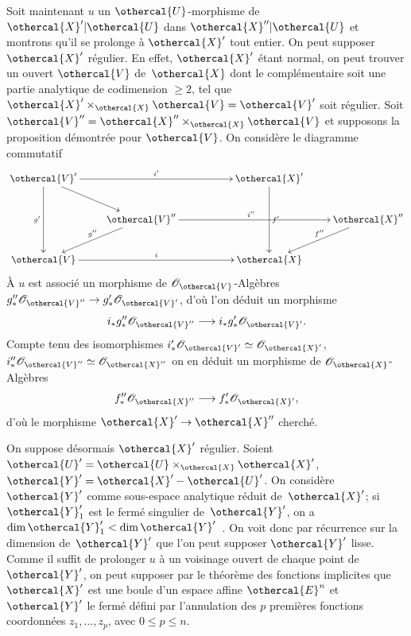 Soit maintenant $u$ un $\othercal{U}$-morphisme de~$\othercal{X}'|\othercal{U}$
dans $\othercal{X}''|\othercal{U}$ et montrons qu'il se prolonge \`a
$\othercal{X}'$ tout entier. On peut supposer $\othercal{X}'$ r\'egulier.
En effet, $\othercal{X}'$ \'etant normal, on peut trouver un ouvert
$\othercal{V}$ de~$\othercal{X}$ dont le compl\'ementaire soit une partie
analytique de codimension $\geq 2$, tel que
$\othercal{X}'\times_{\othercal{X}}\othercal{V}=\othercal{V}'$ soit r\'egulier.
Soit $\othercal{V}''=\othercal{X}''\times_{\othercal{X}}\othercal{V}$ et supposons la
proposition d\'emontr\'ee pour $\othercal{V}$. On consid\`ere le
diagramme commutatif
$$
\xymatrix{{\othercal{V}'}\ar[dd]_{g'}\ar[rd]\ar[rrr]^{i'}&& &{\othercal{X}'}\ar[dd]^{f'}\\ &{\othercal{V}''}\ar[ld]_{g''\mkern-10mu}\ar[rrr]^-{i''~~}& &
&{\othercal{X}''}\ar[ld]_{f''\mkern-12mu}\\{\othercal{V}}\ar[rrr]^{i}&& &{\othercal{X}}\\
}
$$
\`A $u$ est associ\'e un morphisme de
$\cal{O}_{\othercal{V}}$-Alg\`ebres $g''_*\cal{O}_{\othercal{V}''}\to
g'_*\cal{O}_{\othercal{V}'}$, d'o\`u l'on d\'eduit un morphisme
$$
i_*g''_*\cal{O}_{\othercal{V}''} \to
i_*g'_*\cal{O}_{\othercal{V}'}\quoi.
$$
Compte tenu des isomorphismes
$i'_*\cal{O}_{\othercal{V}'}\simeq\cal{O}_{\othercal{X}'}$,
$i''_*\cal{O}_{\othercal{V}''}\simeq\cal{O}_{\othercal{X}''}$
\cite[~prop.\, 4]{XII.11} on en d\'eduit un morphisme de
$\cal{O}_{\othercal{X}}$-Alg\`ebres
$$
f''_*\cal{O}_{\othercal{X}''} \to
f'_*\cal{O}_{\othercal{X}'}\quoi,
$$
d'o\`u le morphisme $\othercal{X}'\to\othercal{X}''$ cherch\'e.

On
suppose d\'esormais $\othercal{X}'$ r\'egulier. Soient
$\othercal{U}'=\othercal{U}\times_{\othercal{X}}\othercal{X}'$,
$\othercal{Y}'=\othercal{X}'-\othercal{U}'$. On consid\`ere $\othercal{Y}'$ comme
sous-espace analytique r\'eduit de~$\othercal{X}'$; si $\othercal{Y}'_{1}$
est le ferm\'e singulier de~$\othercal{Y}'$, on a $\dim \othercal{Y}'_{1} <
\dim \othercal{Y}'$~\cite[~D.\, Th.\, 3]{XII.4}. On voit donc par r\'ecurrence
sur la dimension de~$\othercal{Y}'$ que l'on peut supposer $\othercal{Y}'$
lisse. Comme il suffit de prolonger $u$ \`a un voisinage ouvert de
chaque point de~$\othercal{Y}'$, on peut supposer par le th\'eor\`eme
des fonctions implicites que $\othercal{X}'$ est une boule d'un espace
affine $\othercal{E}^{n}$ et $\othercal{Y}'$ le ferm\'e d\'efini par
l'annulation des $p$ premi\`eres fonctions coordonn\'ees
$z_{1},\dots,z_{p}$, avec $0\leq p\leq n$.

